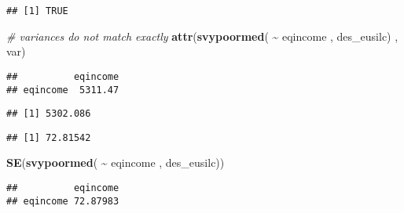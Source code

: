 \documentclass[
]{book}
\newenvironment{Shaded}{\begin{snugshade}}{\end{snugshade}}
\newcommand{\CommentTok}[1]{\textcolor[rgb]{0.56,0.35,0.01}{\textit{#1}}}
\newcommand{\FunctionTok}[1]{\textcolor[rgb]{0.13,0.29,0.53}{\textbf{#1}}}
\newcommand{\NormalTok}[1]{#1}
\newcommand{\SpecialCharTok}[1]{\textcolor[rgb]{0.81,0.36,0.00}{\textbf{#1}}}
\newcommand{\StringTok}[1]{\textcolor[rgb]{0.31,0.60,0.02}{#1}}
\begin{document}
\begin{verbatim}
## [1] TRUE
\end{verbatim}

\begin{Shaded}
\begin{Highlighting}[]
\CommentTok{\# variances do not match exactly}
\FunctionTok{attr}\NormalTok{(}\FunctionTok{svypoormed}\NormalTok{( }\SpecialCharTok{\textasciitilde{}}\NormalTok{ eqincome , des\_eusilc) , }\StringTok{\textquotesingle{}var\textquotesingle{}}\NormalTok{)}
\end{Highlighting}
\end{Shaded}

\begin{verbatim}
##          eqincome
## eqincome  5311.47
\end{verbatim}

\begin{Shaded}
\end{Shaded}

\begin{verbatim}
## [1] 5302.086
\end{verbatim}

\begin{Shaded}
\end{Shaded}

\begin{verbatim}
## [1] 72.81542
\end{verbatim}

\begin{Shaded}
\begin{Highlighting}[]
\FunctionTok{SE}\NormalTok{(}\FunctionTok{svypoormed}\NormalTok{( }\SpecialCharTok{\textasciitilde{}}\NormalTok{ eqincome , des\_eusilc))}
\end{Highlighting}
\end{Shaded}

\begin{verbatim}
##          eqincome
## eqincome 72.87983
\end{verbatim}
\end{document}
